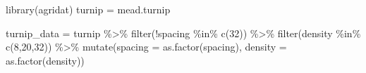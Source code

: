 \documentclass[
]{book}
\newenvironment{Shaded}{\begin{snugshade}}{\end{snugshade}}
\newcommand{\AttributeTok}[1]{\textcolor[rgb]{0.77,0.63,0.00}{#1}}
\newcommand{\DecValTok}[1]{\textcolor[rgb]{0.00,0.00,0.81}{#1}}
\newcommand{\FunctionTok}[1]{\textcolor[rgb]{0.00,0.00,0.00}{#1}}
\newcommand{\NormalTok}[1]{#1}
\newcommand{\OtherTok}[1]{\textcolor[rgb]{0.56,0.35,0.01}{#1}}
\newcommand{\SpecialCharTok}[1]{\textcolor[rgb]{0.00,0.00,0.00}{#1}}
\begin{document}
\begin{Shaded}
\begin{Highlighting}[]
\FunctionTok{library}\NormalTok{(agridat)}
\NormalTok{turnip }\OtherTok{=}\NormalTok{ mead.turnip}

\NormalTok{turnip\_data }\OtherTok{=}\NormalTok{ turnip }\SpecialCharTok{\%\textgreater{}\%}
  \FunctionTok{filter}\NormalTok{(}\SpecialCharTok{!}\NormalTok{spacing }\SpecialCharTok{\%in\%} \FunctionTok{c}\NormalTok{(}\DecValTok{32}\NormalTok{)) }\SpecialCharTok{\%\textgreater{}\%}
  \FunctionTok{filter}\NormalTok{(density }\SpecialCharTok{\%in\%} \FunctionTok{c}\NormalTok{(}\DecValTok{8}\NormalTok{,}\DecValTok{20}\NormalTok{,}\DecValTok{32}\NormalTok{)) }\SpecialCharTok{\%\textgreater{}\%}
  \FunctionTok{mutate}\NormalTok{(}\AttributeTok{spacing =} \FunctionTok{as.factor}\NormalTok{(spacing),}
         \AttributeTok{density =} \FunctionTok{as.factor}\NormalTok{(density))}


\end{Highlighting}
\end{Shaded}
\end{document}
